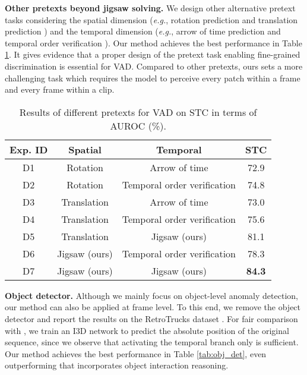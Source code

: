 \documentclass[runningheads]{llncs}
\begin{document}
\textbf{Other pretexts beyond jigsaw solving.} We design other alternative pretext tasks considering the spatial dimension (\emph{e.g.}, rotation prediction \cite{komodakis2018unsupervised} and translation prediction \cite{hendrycks2019using}) and the temporal dimension (\emph{e.g.}, arrow of time prediction \cite{wei2018learning} and temporal order verification \cite{misra2016shuffle}). Our method achieves the best performance in Table \ref{tab:pretext}. It gives evidence that a proper design of the pretext task enabling fine-grained discrimination is essential for VAD. Compared to other pretexts, ours sets a more challenging task which requires the model to perceive every patch within a frame and every frame within a clip.



\begin{table}[!ht]
	\centering
	\caption{Results of different pretexts for VAD on STC in terms of AUROC (\%).}
	\begin{threeparttable}
    	\begin{tabular}{c|c|c|c}
    		\hline
    		\textbf{Exp. ID} & \textbf{Spatial}   & \textbf{Temporal}  & \textbf{STC} \\ \hline\hline
            D1  &  Rotation  &  Arrow of time & 72.9  \\
            D2  &  Rotation  &  Temporal order verification & 74.8  \\
            D3  &  Translation  &  Arrow of time & 73.0  \\
            D4  &  Translation  &  Temporal order verification & 75.6  \\
            D5  &  Translation  & Jigsaw (ours)  & 81.1 \\
            D6  &  Jigsaw (ours)  & Temporal order verification  & 78.3 \\
    	    D7  &  Jigsaw (ours)  & Jigsaw (ours)  & \textbf{84.3} \\
    		\hline
    	\end{tabular}
    \end{threeparttable}
    \label{tab:pretext}
\end{table}



\textbf{Object detector.} Although we mainly focus on object-level anomaly detection, our method can also be applied at frame level. To this end, we remove the object detector and report the results on the RetroTrucks dataset \cite{haresh2020towards}. For fair comparison with \cite{haresh2020towards}, we train an I3D \cite{wang2018non} network to predict the absolute position of the original sequence, since we observe that activating the temporal branch only is sufficient. Our method achieves the best performance in Table \ref{tab:obj_det}, even outperforming \cite{haresh2020towards} that incorporates object interaction reasoning.
\end{document}
